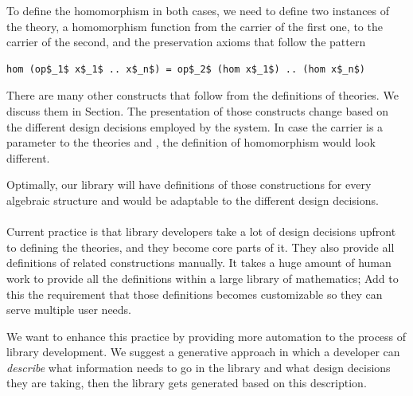 To define the homomorphism in both cases, we need to define two instances of the theory, a homomorphism function from the carrier of the first one, to the carrier of the second, and the preservation axioms that follow the pattern
\begin{lstlisting}[mathescape]
hom (op$_1$ x$_1$ .. x$_n$) = op$_2$ (hom x$_1$) .. (hom x$_n$)
\end{lstlisting} 

There are many other constructs that follow from the definitions of theories. We discuss them in Section. The presentation of those constructs change based on the different design decisions employed by the system. In case the carrier is a parameter to the theories  and , the definition of homomorphism would look different. 

Optimally, our library will have definitions of those constructions for every algebraic structure and would be adaptable to the different design decisions. 

\paragraph{}
Current practice is that library developers take a lot of design decisions upfront to defining the theories, and they become core parts of it. They also provide all definitions of related constructions manually. It takes a huge amount of human work to provide all the definitions within a large library of mathematics; Add to this the requirement that those definitions becomes customizable so they can serve multiple user needs. 

We want to enhance this practice by providing more automation to the process of library development. We suggest a generative approach in which a developer can \emph{describe} what information needs to go in the library and what design decisions they are taking, then the library gets generated based on this description. 

